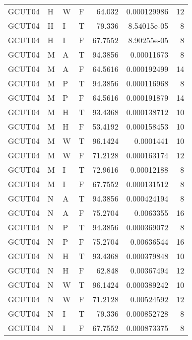 \begin{table}[!htb]
{\begin{tabular}{llllrrr}
            GCUT04   & H     & W     & F          & 64.032     & 0.000129986 & 12       \\
            GCUT04   & H     & I     & T          & 79.336     & 8.54015e-05 & 8        \\
            GCUT04   & H     & I     & F          & 67.7552    & 8.90255e-05 & 8        \\
            GCUT04   & M     & A     & T          & 94.3856    & 0.00011673  & 8        \\
            GCUT04   & M     & A     & F          & 64.5616    & 0.000192499 & 14       \\
            GCUT04   & M     & P     & T          & 94.3856    & 0.000116968 & 8        \\
            GCUT04   & M     & P     & F          & 64.5616    & 0.000191879 & 14       \\
            GCUT04   & M     & H     & T          & 93.4368    & 0.000138712 & 10       \\
            GCUT04   & M     & H     & F          & 53.4192    & 0.000158453 & 10       \\
            GCUT04   & M     & W     & T          & 96.1424    & 0.0001441   & 10       \\
            GCUT04   & M     & W     & F          & 71.2128    & 0.000163174 & 12       \\
            GCUT04   & M     & I     & T          & 72.9616    & 0.00012188  & 8        \\
            GCUT04   & M     & I     & F          & 67.7552    & 0.000131512 & 8        \\
            GCUT04   & N     & A     & T          & 94.3856    & 0.000424194 & 8        \\
            GCUT04   & N     & A     & F          & 75.2704    & 0.0063355   & 16       \\
            GCUT04   & N     & P     & T          & 94.3856    & 0.000369072 & 8        \\
            GCUT04   & N     & P     & F          & 75.2704    & 0.00636544  & 16       \\
            GCUT04   & N     & H     & T          & 93.4368    & 0.000379848 & 10       \\
            GCUT04   & N     & H     & F          & 62.848     & 0.00367494  & 12       \\
            GCUT04   & N     & W     & T          & 96.1424    & 0.000389242 & 10       \\
            GCUT04   & N     & W     & F          & 71.2128    & 0.00524592  & 12       \\
            GCUT04   & N     & I     & T          & 79.336     & 0.000852728 & 8        \\
            GCUT04   & N     & I     & F          & 67.7552    & 0.000873375 & 8        \\
            \hline
        \end{tabular}
    }{}
\end{table}